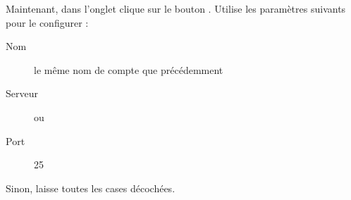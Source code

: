 Maintenant, dans l'onglet  clique sur le
bouton . Utilise les param\`etres suivants pour le
configurer :
\begin{description}
  \item[Nom] le m\^eme nom de compte que pr\'ec\'edemment
  \item[Serveur]  ou 
  \item[Port] 25
\end{description}
Sinon, laisse toutes les cases d\'ecoch\'ees.

%
%



